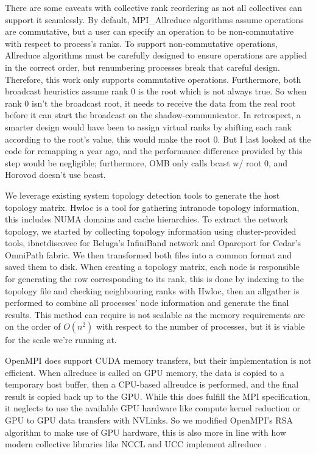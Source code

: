 There are some caveats with collective rank reordering as not all collectives can support it seamlessly.
By default, MPI\_Allreduce algorithms assume operations are commutative, but a user can specify an operation to be non-commutative with respect to process's ranks. 
To support non-commutative operations, Allreduce algorithms must be carefully designed to ensure operations are applied in the correct order, but renumbering processes break that careful design.
Therefore, this work only supports commutative operations.
Furthermore, both broadcast heuristics assume rank 0 is the root which is not always true. 
So when rank 0 isn't the broadcast root, it needs to receive the data from the real root before it can start the broadcast on the shadow-communicator.
In retrospect, a smarter design would have been to assign virtual ranks by shifting each rank according to the root's value, this would make the root 0.
But I last looked at the code for remapping a year ago, and the performance difference provided by this step would be negligible; furthermore, OMB only calls bcast w/ root 0, and Horovod doesn't use bcast.

We leverage existing system topology detection tools to generate the host topology matrix.
Hwloc \cite{Broquedis2010hwloc} is a tool for gathering intranode topology information, this includes NUMA domains and cache hierarchies.
To extract the network topology, we started by collecting topology information using cluster-provided tools, ibnetdiscovee for Beluga's InfiniBand network and Opareport for Cedar's OmniPath fabric.
We then transformed both files into a common format and saved them to disk.
When creating a topology matrix, each node is responsible for generating the row corresponding to its rank, this is done by indexing to the topology file and checking neighbouring ranks with Hwloc, then an allgather is performed to combine all processes' node information and generate the final results.
This method can require is not scalable as the memory requirements are on the order of $O(n^2)$ with respect to the number of processes, but it is viable for the scale we're running at.

OpenMPI does support CUDA memory transfers, but their implementation is not efficient. 
When allreduce is called on GPU memory, the data is copied to a temporary host buffer, then a CPU-based allreudce is performed, and the final result is copied back up to the GPU.
While this does fulfill the MPI specification, it neglects to use the available GPU hardware like compute kernel reduction or GPU to GPU data transfers with NVLinks.
So we modified OpenMPI's RSA algorithm to make use of GPU hardware, this is also more in line with how modern collective libraries like NCCL and UCC implement allreduce \cite{UCC, NCCL}.

